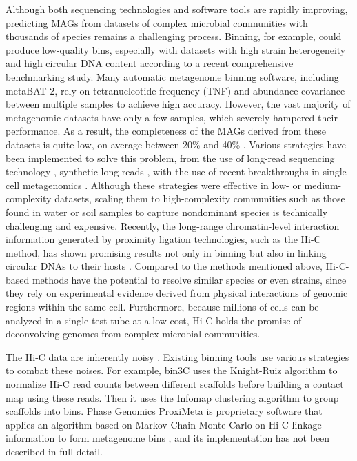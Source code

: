 \documentclass[fleqn,10pt,lineno]{wlpeerj}
\begin{document}
Although both sequencing technologies and software tools are rapidly improving, predicting MAGs from datasets of complex microbial communities with thousands of species remains a challenging process. Binning, for example, could produce low-quality bins, especially with datasets with high strain heterogeneity and high circular DNA content according to a recent comprehensive benchmarking study\citep{meyer2021critical}. Many automatic metagenome binning software, including metaBAT 2, rely on tetranucleotide frequency (TNF) and abundance covariance between multiple samples \citep{kang2019metabat} to achieve high accuracy. However, the vast majority of metagenomic datasets have only a few samples, which severely hampered their performance. As a result, the completeness of the MAGs derived from these datasets is quite low, on average between 20\% and 40\% \citep{meyer2021critical}. Various strategies have been implemented to solve this problem, from the use of long-read sequencing technology \citep{Bickhart2022GeneratingLC, Frank2016ImprovedMA}, synthetic long reads \citep{Chen2019SimpleAS}, 
with the use of recent breakthroughs in single cell metagenomics \citep{Arikawa2021RecoveryOH, bowers2022dissecting}. Although these strategies were effective in low- or medium-complexity datasets, scaling them to high-complexity communities such as those found in water or soil samples to capture nondominant species is technically challenging and expensive. Recently, the long-range chromatin-level interaction information generated by proximity ligation technologies, such as the Hi-C method, has shown promising results not only in binning but also in linking circular DNAs to their hosts \citep{Burton2014SpeciesLevelDO, Beitel2014StrainAP, press2017hi}. Compared to the methods mentioned above, Hi-C-based methods have the potential to resolve similar species or even strains, since they rely on experimental evidence derived from physical interactions of genomic regions within the same cell. Furthermore, because millions of cells can be analyzed in a single test tube at a low cost, Hi-C holds the promise of deconvolving genomes from complex microbial communities.

The Hi-C data are inherently noisy \citep{Yaffe2011ProbabilisticMO}. Existing binning tools use various strategies to combat these noises. For example, bin3C uses the Knight-Ruiz algorithm to normalize Hi-C read counts between different scaffolds before building a contact map using these reads. Then it uses the Infomap clustering algorithm to group scaffolds into bins\citep{demaere2019bin3c}.  Phase Genomics ProxiMeta is proprietary software that applies an algorithm based on Markov Chain Monte Carlo on Hi-C linkage information to form metagenome bins \citep{press2017hi}, and its implementation has not been described in full detail.
\end{document}
